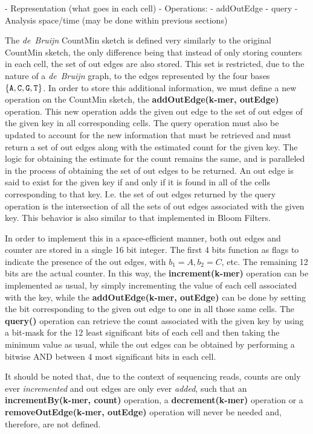 - Representation (what goes in each cell)
- Operations:
  - addOutEdge
  - query 
- Analysis space/time (may be done within previous sections)

The \emph{de~Bruijn} CountMin sketch is defined very similarly to the original CountMin sketch, the only difference being that instead of only storing counters in each cell, the set of out edges are also stored.
This set is restricted, due to the nature of a \emph{de~Bruijn} graph, to the edges represented by the four bases $\{\mathtt{A}, \mathtt{C}, \mathtt{G}, \mathtt{T}\}$.
In order to store this additional information, we must define a new operation on the CountMin sketch, the \textbf{addOutEdge(k-mer, outEdge)} operation.
This new operation adds the given out edge to the set of out edges of the given key in all corresponding cells. The query operation must also be updated
to account for the new information that must be retrieved and must return a set of out edges along with the estimated count for the given key.
The logic for obtaining the estimate for the count remains the same, and is paralleled in the process of obtaining the set of out edges to be returned.
An out edge is said to exist for the given key if and only if it is found in all of the cells corresponding to that key. I.e. the set of out edges
returned by the query operation is the intersection of all the sets of out edges associated with the given key. This behavior is also similar to that
implemented in Bloom Filters.

In order to implement this in a space-efficient manner, both out edges and counter are stored in a single 16 bit integer. The first 4 bits
function as flags to indicate the presence of the out edges, with $b_1 = A, b_2 = C$, etc. The remaining 12 bits are the actual counter.
In this way, the \textbf{increment(k-mer)} operation can be implemented as usual, by simply incrementing the value of each cell associated with the key,
while the \textbf{addOutEdge(k-mer, outEdge)} can be done by setting the bit corresponding to the given out edge to one in all those same cells.
The \textbf{query(\kmer)} operation can retrieve the count associated with the given key by using a bit-mask for the 12 least significant bits of each
cell and then taking the minimum value as usual, while the out edges can be obtained by performing a bitwise AND between 4 most significant bits
in each cell.

It should be noted that, due to the context of sequencing reads, counts are only ever \emph{incremented} and out edges are only ever \emph{added},
such that an \textbf{incrementBy(k-mer, count)} operation, a \textbf{decrement(k-mer)} operation or a \textbf{removeOutEdge(k-mer, outEdge)} operation will never be needed and,
therefore, are not defined.

